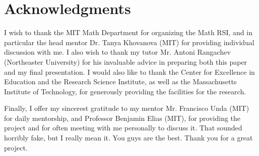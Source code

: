 \section{Acknowledgments} 
I wish to thank the MIT Math Department for organizing the Math RSI, and in particular the head mentor Dr. Tanya Khovanova (MIT) for providing individual discussion with me.
I also wish to thank my tutor Mr. Antoni Rangachev (Northeaster University) for his invaluable advice in preparing both this paper and my final presentation.
I would also like to thank the Center for Excellence in Education and the Research Science Institute, as well as the Massachusetts Institute of Technology, for generously providing the facilities for the research.

Finally, I offer my sincerest gratitude to my mentor Mr. Francisco Unda (MIT) for daily mentorship, and Professor Benjamin Elias (MIT), for providing the project and for often meeting with me personally to discuss it.
That sounded horribly fake, but I really mean it.  You guys are the best.  Thank you for a great project.

